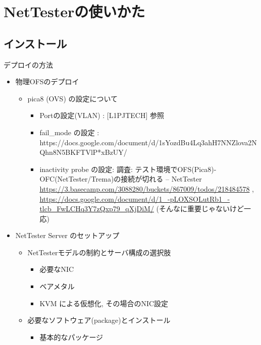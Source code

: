 
\chapter{NetTesterの使いかた}

\section{インストール}

デプロイの方法

\begin{itemize}
 \item 物理OFSのデプロイ
       \begin{itemize}
        \item pica8 (OVS) の設定について
              \begin{itemize}
               \item Portの設定(VLAN) : [L1PJTECH] 参照
               \item fail\_mode の設定 : https://docs.google.com/document/d/1sYozdBu4Lq3ahH7NNZlova2NQhn8N5BKFTVlP*xBzUY/
               \item inactivity probe の設定: 調査: テスト環境でOFS(Pica8)-OFC(NetTester/Trema)の接続が切れる – NetTester \url{https://3.basecamp.com/3088280/buckets/867009/todos/218484578} , \url{https://docs.google.com/document/d/1_-pLOXSOLutRb1_-tlcb_FwLCHq3Y7zQxp79_qXjDiM/}
                     (そんなに重要じゃないけど一応)
              \end{itemize}
       \end{itemize}
 \item NetTester Server のセットアップ
       \begin{itemize}
        \item NetTesterモデルの制約とサーバ構成の選択肢
              \begin{itemize}
               \item 必要なNIC
               \item ベアメタル
               \item KVM による仮想化, その場合のNIC設定
              \end{itemize}
        \item 必要なソフトウェア(package)とインストール
              \begin{itemize}
               \item 基本的なパッケージ
                     \begin{itemize}

\end{itemize}
\end{itemize}
\end{itemize}
\end{itemize}
